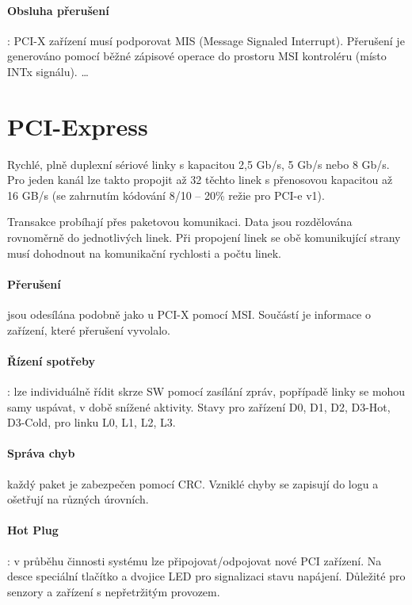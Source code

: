 \documentclass[a4paper, 11pt]{report}
\begin{document}
\paragraph{Obsluha přerušení}: PCI-X zařízení musí podporovat MIS (Message Signaled Interrupt). Přerušení je generováno pomocí běžné zápisové operace do prostoru MSI kontroléru (místo INTx signálu).
\dots



\section{PCI-Express}
Rychlé, plně duplexní sériové linky s kapacitou 2,5 Gb/s, 5 Gb/s nebo 8 Gb/s. Pro jeden kanál lze takto propojit až 32  těchto linek s přenosovou kapacitou až 16 GB/s (se zahrnutím kódování 8/10 -- 20\% režie pro PCI-e v1).

Transakce probíhají přes paketovou komunikaci. Data jsou rozdělována rovnoměrně do jednotlivých linek. Při propojení linek se obě komunikující strany musí dohodnout na komunikační rychlosti a počtu linek.

\paragraph{Přerušení} jsou odesílána podobně jako u PCI-X pomocí MSI. Součástí je informace o zařízení, které přerušení vyvolalo.

\paragraph{Řízení spotřeby}: lze individuálně řídit skrze SW pomocí zasílání zpráv, popřípadě linky se mohou samy uspávat, v době snížené aktivity. Stavy pro zařízení D0, D1, D2, D3-Hot, D3-Cold, pro linku L0, L1, L2, L3.

\paragraph{Správa chyb} každý paket je zabezpečen pomocí CRC. Vzniklé chyby se zapisují do logu a ošetřují na různých úrovních.

\paragraph{Hot Plug}: v průběhu činnosti systému lze připojovat/odpojovat nové PCI zařízení. Na desce speciální tlačítko a dvojice LED pro signalizaci stavu napájení. Důležité pro senzory a zařízení s nepřetržitým provozem.
\end{document}

